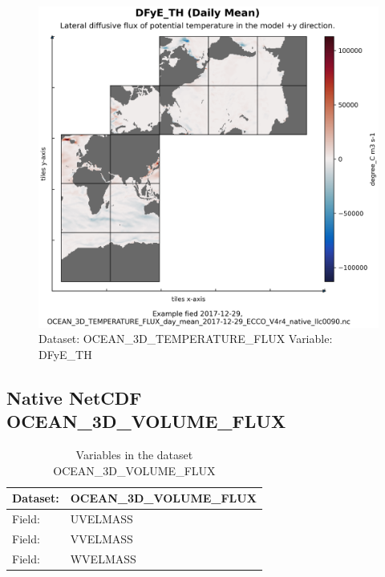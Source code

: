 \begin{figure}[H]
\centering
\includegraphics[width=\textwidth]{../images/plots/native_plots/Ocean_Three-Dimensional_Potential_Temperature_Fluxes/DFyE_TH.png}
\caption{Dataset: OCEAN\_3D\_TEMPERATURE\_FLUX Variable: DFyE\_TH}
\label{tab:table-OCEAN_3D_TEMPERATURE_FLUX_DFyE_TH-Plot}
\end{figure}
\pagebreak
\subsection{Native NetCDF OCEAN\_3D\_VOLUME\_FLUX}
\newp
\begin{longtable}{|p{}|p{}|}
\caption{Variables in the dataset OCEAN\_3D\_VOLUME\_FLUX}
\label{tab:table-OCEAN_3D_VOLUME_FLUX-fields} \\ 
\hline \endhead \hline \endfoot
\rowcolor{lightgray} \textbf{Dataset:} & \textbf{OCEAN\_3D\_VOLUME\_FLUX} \\ \hline
Field: &UVELMASS \\ \hline
Field: &VVELMASS \\ \hline
Field: &WVELMASS \\ \hline
\end{longtable}

\pagebreak
